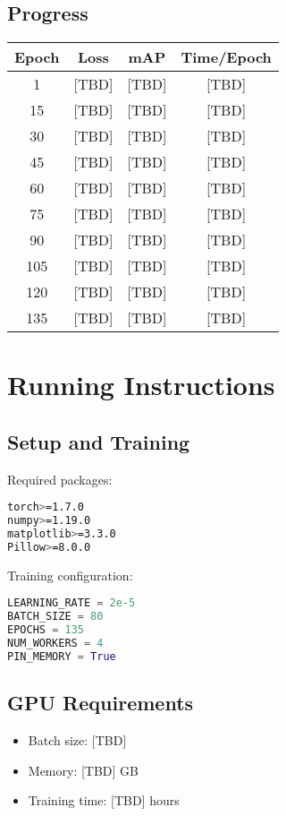 \documentclass[conference]{IEEEtran}
\begin{document}
\subsection{Progress}
\begin{center}
\begin{tabular}{cccc}
\toprule
Epoch & Loss & mAP & Time/Epoch \\
\midrule
1 & [TBD] & [TBD] & [TBD] \\
15 & [TBD] & [TBD] & [TBD] \\
30 & [TBD] & [TBD] & [TBD] \\
45 & [TBD] & [TBD] & [TBD] \\
60 & [TBD] & [TBD] & [TBD] \\
75 & [TBD] & [TBD] & [TBD] \\
90 & [TBD] & [TBD] & [TBD] \\
105 & [TBD] & [TBD] & [TBD] \\
120 & [TBD] & [TBD] & [TBD] \\
135 & [TBD] & [TBD] & [TBD] \\
\bottomrule
\end{tabular}
\end{center}

\section{Running Instructions}

\subsection{Setup and Training}

\begin{center}
Required packages:
\begin{lstlisting}[language=bash]
torch>=1.7.0
numpy>=1.19.0
matplotlib>=3.3.0
Pillow>=8.0.0
\end{lstlisting}

Training configuration:
\begin{lstlisting}[language=python]
LEARNING_RATE = 2e-5
BATCH_SIZE = 80
EPOCHS = 135
NUM_WORKERS = 4
PIN_MEMORY = True
\end{lstlisting}
\end{center}

\subsection{GPU Requirements}
\begin{itemize}
    \item Batch size: [TBD]
    \item Memory: [TBD] GB
    \item Training time: [TBD] hours
\end{itemize}
\end{document}
